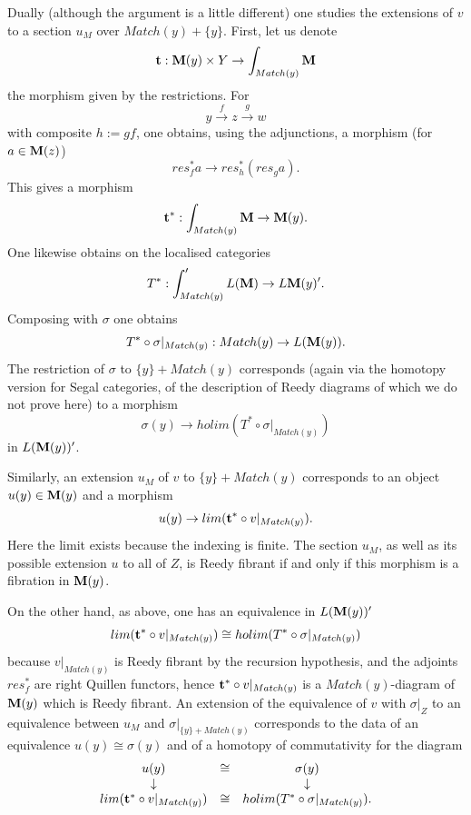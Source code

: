 Dually (although the argument is a little different) one studies the
extensions of
$v$ to a section $u_M$ over $Match (y)+ \{ y\}$. First, let us denote
$$
{\bf t}: {\bf M} (y)\times Y \rightarrow \int _{Match (y)}{\bf M}
$$
the morphism given by the restrictions. For
$$
y\stackrel{f}{\rightarrow}z\stackrel{g}{\rightarrow}w
$$
with composite $h:= gf$, one obtains, using the adjunctions, a
morphism (for $a\in {\bf M} (z)$)
$$
res_f^{\ast} a \rightarrow res _h^{\ast} (res_ga).
$$
This gives a morphism
$$
{\bf t}^{\ast} : \int _{Match (y)}{\bf M} \rightarrow
{\bf M} (y).
$$
One likewise obtains on the localised categories
$$
T^{\ast} : \int '_{Match (y)}L({\bf M} )\rightarrow
L{\bf M} (y)'.
$$
Composing with $\sigma$ one obtains
$$
T^{\ast}\circ \sigma |_{Match(y)}: Match(y)\rightarrow L({\bf M} (y)).
$$
The restriction of $\sigma$ to $\{ y\} + Match(y)$ corresponds
(again via
the homotopy version for Segal categories, of the description of
Reedy diagrams of \cite{Hirschhorn} \cite{DHK} which we do not prove
here) to a morphism
$$
\sigma (y) \rightarrow
holim (T^{\ast} \circ \sigma |_{Match(y)})
$$
in $L({\bf M} (y))'$.

Similarly, an extension $u_M$ of $v$ to $\{ y\} + Match(y)$
corresponds to an object $u(y)\in {\bf M} (y)$ and a morphism
$$
u(y)\rightarrow lim ({\bf t}^{\ast} \circ v|_{Match(y)}).
$$
Here the limit exists because the indexing is finite.
The section $u_M$, as well as its possible extension $u$ to all of $Z$, is
Reedy fibrant if and only if this morphism is a fibration in ${\bf M}
(y)$.

On the other hand, as above, one has an equivalence in $L({\bf M} (y))'$
$$
lim ({\bf t}^{\ast} \circ v|_{Match(y)})\cong
holim (T^{\ast} \circ \sigma |_{Match(y)})
$$
because $v|_{Match(y)}$ is Reedy fibrant by the recursion hypothesis, and the
adjoints $res _f^{\ast}$ are right Quillen functors, hence
${\bf t}^{\ast} \circ v|_{Match(y)}$ is a $Match(y)$-diagram of ${\bf M} (y)$
which is
Reedy fibrant. An extension of the equivalence of $v$ with $\sigma |_Z$ to
an equivalence between $u_M$ and $\sigma |_{\{ y\} + Match (y)}$ corresponds
to the data of an equivalence $u(y)\cong \sigma (y)$ and of a homotopy of
commutativity for the diagram
$$
\begin{array}{ccc}
u(y) & \cong & \sigma (y) \\
\downarrow && \downarrow \\
lim ({\bf t}^{\ast} \circ v|_{Match(y)})& \cong &
holim (T^{\ast} \circ \sigma |_{Match(y)}).
\end{array}
$$

